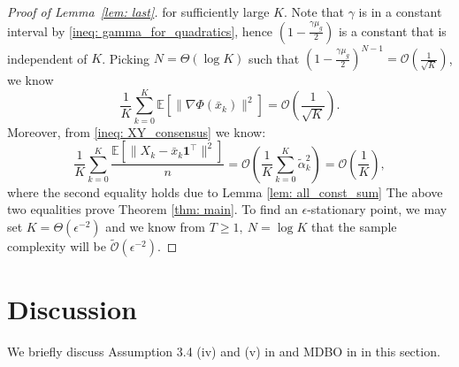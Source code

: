 \documentclass{article}
\theoremstyle{plain}
\theoremstyle{definition}
\theoremstyle{remark}
\newcommand{\E}{\mathbb{E}}
\newcommand{\cO}{\mathcal{O}}
\newcommand{\bfonet}{\mathbf{1}^{\top}}
\begin{document}
\begin{proof}[Proof of Lemma~\ref{lem: last}]
    for sufficiently large $K$. Note that $\gamma$ is in a constant interval by \eqref{ineq: gamma_for_quadratics}, hence $\left(1-\frac{\gamma\mu_g}{2}\right)$ is a constant that is independent of $K$. Picking $N = \Theta(\log K)$ such that $\left(1-\frac{\gamma\mu_g}{2}\right)^{N-1} = \cO\left(\frac{1}{\sqrt{K}}\right)$, we know
    \[
        \frac{1}{K}\sum_{k=0}^{K}\E\left[\|\nabla\Phi(\bar{x}_k)\|^2\right] = \cO\left(\frac{1}{\sqrt{K}}\right).
    \]
    Moreover, from \eqref{ineq: XY_consensus} we know:
    \[
        \frac{1}{K}\sum_{k=0}^{K}\frac{\E\left[\|X_k - \bar{x}_k\bfonet\|^2\right]}{n} = \cO\left(\frac{1}{K}\sum_{k=0}^{K}\tilde{\alpha}_k^2\right) = \cO\left(\frac{1}{K}\right),
    \]
    where the second equality holds due to Lemma \ref{lem: all_const_sum}
    The above two equalities prove Theorem \ref{thm: main}. To find an $\epsilon$-stationary point, we may set $K = \Theta(\epsilon^{-2})$ and we know from $T\geq 1,\ N=\log K$ that the sample complexity will be
    $\tilde{\cO}(\epsilon^{-2})$.
\end{proof}

\section{Discussion}\label{sec: discussion}
We briefly discuss Assumption 3.4 (iv) and (v) in \citet{yang2022decentralized} and MDBO in \cite{gao2022stochastic} in this section.
\end{document}
